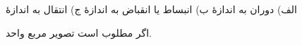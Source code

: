 الف) دوران به اندازهٔ 
ب) انبساط یا انقباض به اندازهٔ 
ج) انتقال به اندازهٔ 

\begin{EMexample}{}

اگر  مطلوب است تصویر مربع واحد.


\end{EMexample}

\begin{EMunit}


\end{EMunit}
